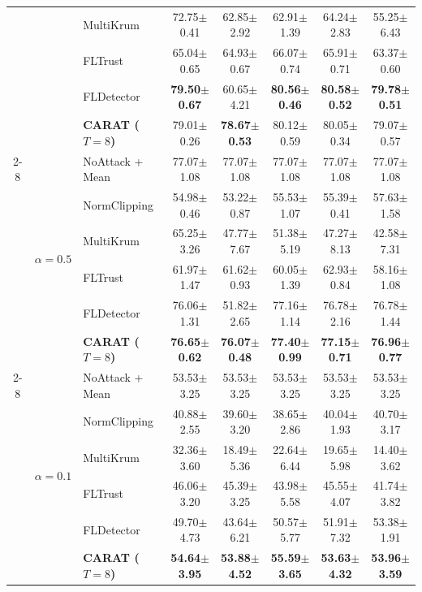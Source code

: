 \begin{table}[!t]
{\begin{tabular}{c c l c c c c c}
  & & MultiKrum & 72.75$\pm$0.41 & 62.85$\pm$2.92 & 62.91$\pm$1.39 & 64.24$\pm$2.83 & 55.25$\pm$6.43 \\
  & & FLTrust & 65.04$\pm$0.65 & 64.93$\pm$0.67 & 66.07$\pm$0.74 & 65.91$\pm$0.71 & 63.37$\pm$0.60 \\
  & & FLDetector & \textbf{79.50$\pm$0.67} & 60.65$\pm$4.21 & \textbf{80.56$\pm$0.46} & \textbf{80.58$\pm$0.52} & \textbf{79.78$\pm$0.51} \\
  & & \cellcolor{caratrow}\textbf{CARAT ($T=8$)} & \cellcolor{caratrow}79.01$\pm$0.26 & \cellcolor{caratrow}\textbf{78.67$\pm$0.53} & \cellcolor{caratrow}80.12$\pm$0.59 & \cellcolor{caratrow}80.05$\pm$0.34 & \cellcolor{caratrow}79.07$\pm$0.57 \\
  \cmidrule(lr){2-8}
  & \multirow{6}{*}{$\alpha=0.5$}
  & NoAttack + Mean & 77.07$\pm$1.08  & 77.07$\pm$1.08  & 77.07$\pm$1.08  & 77.07$\pm$1.08  & 77.07$\pm$1.08 \\
  & & NormClipping & 54.98$\pm$0.46 & 53.22$\pm$0.87 & 55.53$\pm$1.07 & 55.39$\pm$0.41 & 57.63$\pm$1.58 \\
  & & MultiKrum & 65.25$\pm$3.26 & 47.77$\pm$7.67 & 51.38$\pm$5.19 & 47.27$\pm$8.13 & 42.58$\pm$7.31 \\
  & & FLTrust & 61.97$\pm$1.47 & 61.62$\pm$0.93 & 60.05$\pm$1.39 & 62.93$\pm$0.84 & 58.16$\pm$1.08 \\
  & & FLDetector & 76.06$\pm$1.31 & 51.82$\pm$2.65 & 77.16$\pm$1.14 & 76.78$\pm$2.16 & 76.78$\pm$1.44 \\
  & & \cellcolor{caratrow}\textbf{CARAT ($T=8$)} & \cellcolor{caratrow}\textbf{76.65$\pm$0.62} & \cellcolor{caratrow}\textbf{76.07$\pm$0.48} & \cellcolor{caratrow}\textbf{77.40$\pm$0.99} & \cellcolor{caratrow}\textbf{77.15$\pm$0.71} & \cellcolor{caratrow}\textbf{76.96$\pm$0.77} \\
  \cmidrule(lr){2-8}
  & \multirow{6}{*}{$\alpha=0.1$}
  & NoAttack + Mean & 53.53$\pm$3.25 & 53.53$\pm$3.25 & 53.53$\pm$3.25 & 53.53$\pm$3.25 & 53.53$\pm$3.25 \\
  & & NormClipping & 40.88$\pm$2.55 & 39.60$\pm$3.20 & 38.65$\pm$2.86 & 40.04$\pm$1.93 & 40.70$\pm$3.17 \\
  & & MultiKrum & 32.36$\pm$3.60 & 18.49$\pm$5.36 & 22.64$\pm$6.44 & 19.65$\pm$5.98 & 14.40$\pm$3.62 \\
  & & FLTrust & 46.06$\pm$3.20 & 45.39$\pm$3.25 & 43.98$\pm$5.58 & 45.55$\pm$4.07 & 41.74$\pm$3.82 \\
  & & FLDetector & 49.70$\pm$4.73 & 43.64$\pm$6.21 & 50.57$\pm$5.77 & 51.91$\pm$7.32 & 53.38$\pm$1.91 \\
  & & \cellcolor{caratrow}\textbf{CARAT ($T=8$)} & \cellcolor{caratrow}\textbf{54.64$\pm$3.95} & \cellcolor{caratrow}\textbf{53.88$\pm$4.52} & \cellcolor{caratrow}\textbf{55.59$\pm$3.65} & \cellcolor{caratrow}\textbf{53.63$\pm$4.32} & \cellcolor{caratrow}\textbf{53.96$\pm$3.59} \\
  \bottomrule
  \end{tabular}}
\end{table}
\fi


